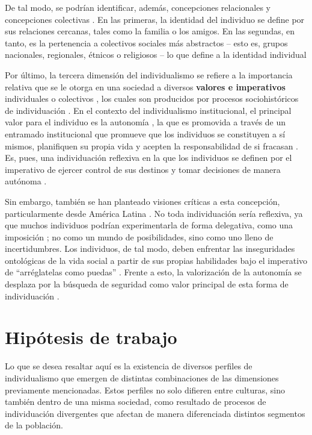 \documentclass[12pt,oneside]{templates/facsothesis}
\begin{document}
De tal modo, se podrían identificar, además, concepciones relacionales y concepciones colectivas \citep{brewer2007}. En las primeras, la identidad del individuo se define por sus relaciones cercanas, tales como la familia o los amigos. En las segundas, en tanto, es la pertenencia a colectivos sociales más abstractos -- esto es, grupos nacionales, regionales, étnicos o religiosos -- lo que define a la identidad individual \citep{brewer2007}

Por último, la tercera dimensión del individualismo se refiere a la importancia relativa que se le otorga en una sociedad a diversos \textbf{valores e imperativos} individuales o colectivos \citep{brewer2007}, los cuales son producidos por procesos sociohistóricos de individuación \citep{martuccelli2018}. En el contexto del individualismo institucional, el principal valor para el individuo es la autonomía \citep{martuccelli2010}, la que es promovida a través de un entramado institucional \citep{martuccelli2018} que promueve que los individuos se constituyen a sí mismos, planifiquen su propia vida y acepten la responsabilidad de si fracasan \citep{robles2001}. Es, pues, una individuación reflexiva en la que los individuos se definen por el imperativo de ejercer control de sus destinos y tomar decisiones de manera autónoma \citep{silvapalacios2015, robles2001}.

Sin embargo, también se han planteado visiones críticas a esta concepción, particularmente desde América Latina \citep{araujo2012, robles2001}. No toda individuación sería reflexiva, ya que muchos individuos podrían experimentarla de forma delegativa, como una imposición \citep{silvapalacios2015}; no como un mundo de posibilidades, sino como uno lleno de incertidumbres. Los individuos, de tal modo, deben enfrentar las inseguridades ontológicas de la vida social a partir de sus propias habilidades bajo el imperativo de ``arréglatelas como puedas'' \citep{araujo2014, robles2001}. Frente a esto, la valorización de la autonomía se desplaza por la búsqueda de seguridad como valor principal de esta forma de individuación \citep{silvapalacios2015}.

\hypertarget{hipuxf3tesis-de-trabajo}{%
\section*{Hipótesis de trabajo}\label{hipuxf3tesis-de-trabajo}}

Lo que se desea resaltar aquí es la existencia de diversos perfiles de individualismo que emergen de distintas combinaciones de las dimensiones previamente mencionadas. Estos perfiles no solo difieren entre culturas, sino también dentro de una misma sociedad, como resultado de procesos de individuación divergentes que afectan de manera diferenciada distintos segmentos de la población.
\end{document}
